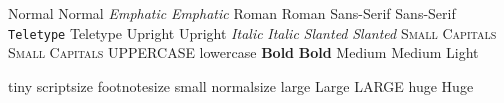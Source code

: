 \textnormal{Normal}	{\normalfont Normal} %
\emph{Emphatic}		{\em Emphatic}
\textrm{Roman} 		{\rmfamily Roman}
\textsf{Sans-Serif} 	{\sffamily Sans-Serif}
\texttt{Teletype} 	{\ttfamily Teletype}
\textup{Upright} 	{\upshape Upright} %
\textit{Italic} 	{\itshape Italic}
\textsl{Slanted} 	{\slshape Slanted}
\textsc{Small Capitals}	{\scshape Small Capitals}
\uppercase{Uppercase}	\lowercase{Lowercase}
\textbf{Bold}		{\bfseries Bold}
\textmd{Medium} 	{\mdseries Medium} %
		{\lfseries Light}

{\tiny tiny}
{\scriptsize scriptsize}
{\footnotesize footnotesize}
{\small small}
{\normalsize normalsize}
{\large large}
{\Large Large}
{\LARGE LARGE}
{\huge huge}
{\Huge Huge}
